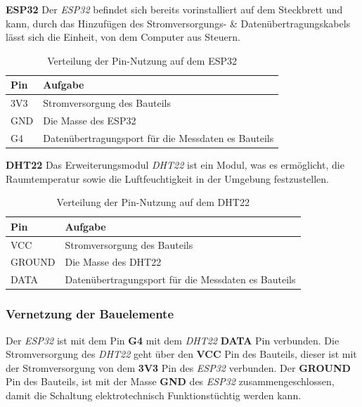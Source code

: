 \documentclass[18pt]{article}
\begin{document}
\textbf{ESP32}
\newline
Der \textit{ESP32} befindet sich bereits vorinstalliert auf dem Steckbrett und kann, durch das Hinzufügen des Stromversorgungs- \& Datenübertragungskabels lässt sich die Einheit, von dem Computer aus Steuern.
\renewcommand{\arraystretch}{1.5}
\begin{table}[h!] %
	\centering %
	\caption{Verteilung der Pin-Nutzung auf dem ESP32} %
	\label{tab:teil_1_steckbrett_esp32} %
	\begin{tabular}{|l|l|} %
		\hline
		Pin & Aufgabe \\
		\hline
		3V3 & Stromversorgung des Bauteils \\
		GND & Die Masse des ESP32 \\
		G4 & Datenübertragungsport für die Messdaten es Bauteils \\
		\hline %
	\end{tabular}
\end{table}
\renewcommand{\arraystretch}{1}
\newline
\newline
\textbf{DHT22}
\newline
Das Erweiterungsmodul \textit{DHT22} ist ein Modul, was es ermöglicht, die Raumtemperatur sowie die Luftfeuchtigkeit in der Umgebung festzustellen.
\renewcommand{\arraystretch}{1.5}
\begin{table}[h!] %
	\centering %
	\caption{Verteilung der Pin-Nutzung auf dem DHT22} %
	\label{tab:teil_1_steckbrett_dht22} %
	\begin{tabular}{|l|l|} %
		\hline
		Pin & Aufgabe \\
		\hline
		VCC & Stromversorgung des Bauteils \\
		GROUND & Die Masse des DHT22 \\
		DATA & Datenübertragungsport für die Messdaten es Bauteils \\
		\hline %
	\end{tabular}
\end{table}
\renewcommand{\arraystretch}{1}

\subsubsection{Vernetzung der Bauelemente}
Der \textit{ESP32} ist mit dem Pin \textbf{G4} mit dem \textit{DHT22} \textbf{DATA} Pin verbunden.
Die Stromversorgung des \textit{DHT22} geht über den \textbf{VCC} Pin des Bauteils, dieser ist mit der Stromversorgung von dem \textbf{3V3} Pin des \textit{ESP32} verbunden.
Der \textbf{GROUND} Pin des Bauteils, ist mit der Masse \textbf{GND} des \textit{ESP32} zusammengeschlossen, damit die Schaltung elektrotechnisch Funktionstüchtig werden kann.
\end{document}
